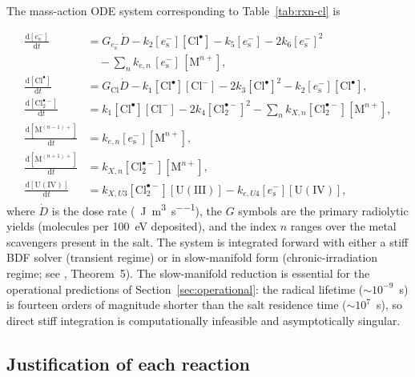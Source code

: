 \documentclass[11pt]{article}
\theoremstyle{plain}
\theoremstyle{definition}
\theoremstyle{remark}
\newcommand{\eS}{\ensuremath{e_{\mathrm{s}}^{-}}\xspace}
\newcommand{\Clt}{\ensuremath{\mathrm{Cl}_2^{\bullet-}}\xspace}
\renewcommand{\d}{\mathrm{d}}
\begin{document}
The mass-action ODE system corresponding to Table~\ref{tab:rxn-cl} is

\begin{align}
\frac{\d[\eS]}{\d t} &= G_{\eS} \dot{D} - k_2 [\eS][\mathrm{Cl}^{\bullet}]
                         - k_5 [\eS] - 2 k_6 [\eS]^2 \nonumber\\
                     & \quad - \sum_{n}  k_{e,n}\,[\eS] \,[\mathrm{M}^{n+}],
\label{eq:eS}\\
\frac{\d[\mathrm{Cl}^{\bullet}]}{\d t}
                     &= G_{\mathrm{Cl}} \dot{D}
                          - k_1 [\mathrm{Cl}^{\bullet}][\mathrm{Cl}^-]
                          - 2 k_3 [\mathrm{Cl}^{\bullet}]^2
                          - k_2 [\eS][\mathrm{Cl}^{\bullet}],
\label{eq:ClD}\\
\frac{\d[\Clt]}{\d t} &= k_1 [\mathrm{Cl}^{\bullet}][\mathrm{Cl}^-]
                         - 2 k_4 [\Clt]^2 - \sum_n k_{X,n} [\Clt][\mathrm{M}^{n+}],
\label{eq:Clt}\\
\frac{\d[\mathrm{M}^{(n-1)+}]}{\d t}
                     &= k_{e,n} [\eS][\mathrm{M}^{n+}],
\label{eq:Mn-1}\\
\frac{\d[\mathrm{M}^{(n+1)+}]}{\d t}
                     &= k_{X,n} [\Clt][\mathrm{M}^{n+}],
\label{eq:Mn+1}\\
\frac{\d[\mathrm{U}(\mathrm{IV})]}{\d t}
                     &= k_{X,U3} [\Clt][\mathrm{U}(\mathrm{III})]
                        - k_{e,U4} [\eS][\mathrm{U}(\mathrm{IV})],
\label{eq:U}
\end{align}
where $\dot{D}$ is the dose rate (\SI{}{\joule\per\meter^3\per\second}), the
$G$ symbols are the primary radiolytic yields (molecules per
\SI{100}{\electronvolt} deposited), and the index $n$ ranges over the metal
scavengers present in the salt.  The system is integrated forward with
either a stiff BDF solver (transient regime) or in slow-manifold form
(chronic-irradiation regime; see \citealp{Tanore2026PaperI}, Theorem~5).
The slow-manifold reduction is essential for the operational predictions of
Section~\ref{sec:operational}: the radical lifetime ($\sim\!10^{-9}$~s) is
fourteen orders of magnitude shorter than the salt residence time
($\sim\!10^7$~s), so direct stiff integration is computationally infeasible
and asymptotically singular.

\subsection{Justification of each reaction}\label{sec:cl:justify}
\end{document}
